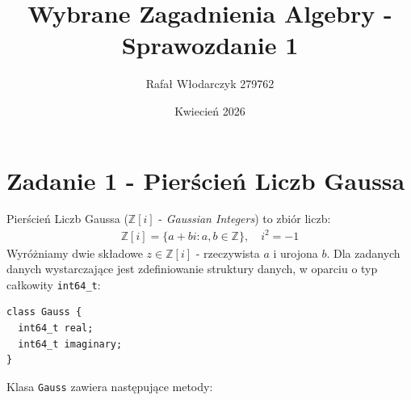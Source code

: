 \documentclass[12pt, a4paper]{article}
\title{Wybrane Zagadnienia Algebry - Sprawozdanie 1}
\author{Rafał Włodarczyk 279762}
\date{Kwiecień 2026}
\begin{document}
\maketitle

\section{Zadanie 1 - Pierścień Liczb Gaussa}

Pierścień Liczb Gaussa ($\mathbb{Z}[i]$ - \textit{Gaussian Integers}) to zbiór liczb:
\begin{align*}
    \mathbb{Z}[i] = \{ a + bi : a, b \in \mathbb{Z} \}, \quad i^2 = -1
\end{align*}
Wyróżniamy dwie składowe $z\in \mathbb{Z}[i]$ - rzeczywista $a$ i urojona $b$. Dla zadanych danych wystarczające jest zdefiniowanie
struktury danych, w oparciu o typ całkowity \texttt{int64\_t}:
\begin{verbatim}
class Gauss {
  int64_t real;
  int64_t imaginary;
}
\end{verbatim}
Klasa \texttt{Gauss} zawiera następujące metody:
\end{document}
